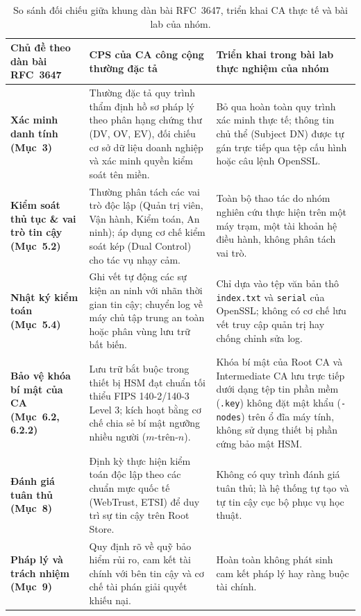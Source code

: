 \begin{table}[!htbp]
\centering
\small
\renewcommand{\arraystretch}{1.25}
\begin{tabularx}{\textwidth}{>{\raggedright\arraybackslash}p{3.2cm}>{\raggedright\arraybackslash}X>{\raggedright\arraybackslash}X}
\toprule
\textbf{Chủ đề theo dàn bài RFC~3647} & \textbf{CPS của CA công cộng thường đặc tả} & \textbf{Triển khai trong bài lab thực nghiệm của nhóm} \\
\midrule
\textbf{Xác minh danh tính (Mục~3)} & Thường đặc tả quy trình thẩm định hồ sơ pháp lý theo phân hạng chứng thư (DV, OV, EV), đối chiếu cơ sở dữ liệu doanh nghiệp và xác minh quyền kiểm soát tên miền. & Bỏ qua hoàn toàn quy trình xác minh thực tế; thông tin chủ thể (Subject DN) được tự gán trực tiếp qua tệp cấu hình hoặc câu lệnh OpenSSL. \\
\midrule
\textbf{Kiểm soát thủ tục \& vai trò tin cậy (Mục~5.2)} & Thường phân tách các vai trò độc lập (Quản trị viên, Vận hành, Kiểm toán, An ninh); áp dụng cơ chế kiểm soát kép (Dual Control) cho tác vụ nhạy cảm. & Toàn bộ thao tác do nhóm nghiên cứu thực hiện trên một máy trạm, một tài khoản hệ điều hành, không phân tách vai trò. \\
\midrule
\textbf{Nhật ký kiểm toán (Mục~5.4)} & Ghi vết tự động các sự kiện an ninh với nhãn thời gian tin cậy; chuyển log về máy chủ tập trung an toàn hoặc phân vùng lưu trữ bất biến. & Chỉ dựa vào tệp văn bản thô \texttt{index.txt} và \texttt{serial} của OpenSSL; không có cơ chế lưu vết truy cập quản trị hay chống chỉnh sửa log. \\
\midrule
\textbf{Bảo vệ khóa bí mật của CA (Mục~6.2, 6.2.2)} & Lưu trữ bắt buộc trong thiết bị HSM đạt chuẩn tối thiểu FIPS 140-2/140-3 Level 3; kích hoạt bằng cơ chế chia sẻ bí mật ngưỡng nhiều người ($m$-trên-$n$). & Khóa bí mật của Root CA và Intermediate CA lưu trực tiếp dưới dạng tệp tin phần mềm (\texttt{.key}) không đặt mật khẩu (\texttt{-nodes}) trên ổ đĩa máy tính, không sử dụng thiết bị phần cứng bảo mật HSM. \\
\midrule
\textbf{Đánh giá tuân thủ (Mục~8)} & Định kỳ thực hiện kiểm toán độc lập theo các chuẩn mực quốc tế (WebTrust, ETSI) để duy trì sự tin cậy trên Root Store. & Không có quy trình đánh giá tuân thủ; là hệ thống tự tạo và tự tin cậy cục bộ phục vụ học thuật. \\
\midrule
\textbf{Pháp lý và trách nhiệm (Mục~9)} & Quy định rõ về quỹ bảo hiểm rủi ro, cam kết tài chính với bên tin cậy và cơ chế tài phán giải quyết khiếu nại. & Hoàn toàn không phát sinh cam kết pháp lý hay ràng buộc tài chính. \\
\bottomrule
\end{tabularx}
\caption[So sánh đối chiếu giữa khung RFC 3647, CA thực tế và bài lab]{So sánh đối chiếu giữa khung dàn bài RFC~3647, triển khai CA thực tế và bài lab của nhóm.}
\label{tab:rfc3647-vs-lab}
\end{table}
